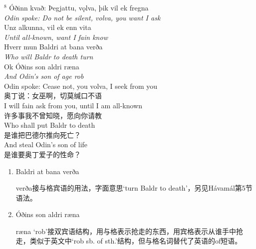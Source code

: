 \begin{paracol}{2}
    \noindent
    $^8$ Óðinn kvað: Þegjattu, vǫlva, þik vil ek fregna\\
    \textit{Odin spoke: Do not be silent, volva, you want I ask}\\
    Unz alkunna, vil ek enn vita\\
    \textit{Until all-known, want I fain know}\\
    Hverr mun Baldri at bana verða\\
    \textit{Who will Baldr to death turn}\\
    Ok Óðins son aldri ræna\\
    \textit{And Odin's son of age rob}\\
    \switchcolumn
    \noindent
    Odin spoke: Cease not, you volva, I seek from you\\
    奥丁说：女巫啊，切莫缄口不语\\
    I will fain ask from you, until I am all-known\\
    许多事我不曾知晓，愿向你请教\\
    Who shall put Baldr to death\\
    是谁把巴德尔推向死亡？\\
    And steal Odin's son of life\\
    是谁要奥丁爱子的性命？\\
\end{paracol}
\begin{grammar*}{}
    \begin{enumerate}[leftmargin=*]
        \item Baldri at bana verða

              verða接与格宾语的用法，字面意思`turn Baldr to death'，另见Hávamál第5节语法。

        \item Óðins son aldri ræna

              ræna `rob'接双宾语结构，用与格表示抢走的东西，用宾格表示从谁手中抢走，类似于英文中`rob sb. of sth.'结构，但与格名词替代了英语的of短语。
    \end{enumerate}
\end{grammar*}

